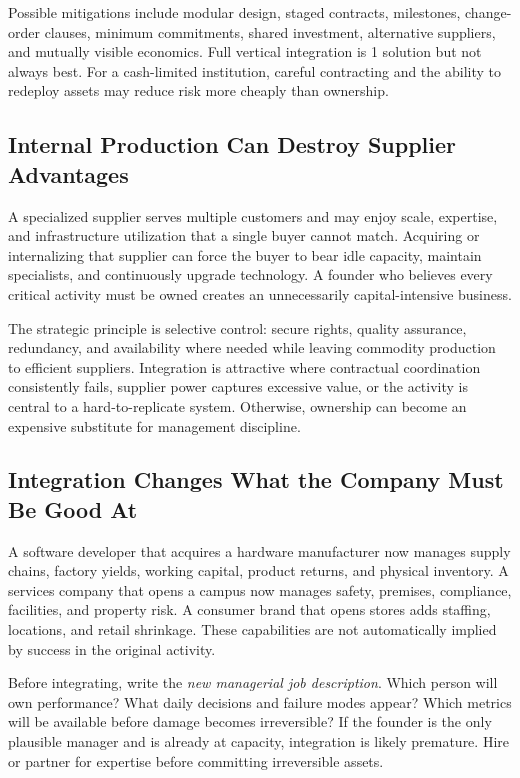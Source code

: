 Possible mitigations include modular design, staged contracts, milestones, change-order clauses, minimum commitments, shared investment, alternative suppliers, and mutually visible economics. Full vertical integration is 1 solution but not always best. For a cash-limited institution, careful contracting and the ability to redeploy assets may reduce risk more cheaply than ownership.

\subsection{Internal Production Can Destroy Supplier Advantages}
\label{sec:internal_production_destroy_supplier_scale}

A specialized supplier serves multiple customers and may enjoy scale, expertise, and infrastructure utilization that a single buyer cannot match. Acquiring or internalizing that supplier can force the buyer to bear idle capacity, maintain specialists, and continuously upgrade technology. A founder who believes every critical activity must be owned creates an unnecessarily capital-intensive business.

The strategic principle is selective control: secure rights, quality assurance, redundancy, and availability where needed while leaving commodity production to efficient suppliers. Integration is attractive where contractual coordination consistently fails, supplier power captures excessive value, or the activity is central to a hard-to-replicate system. Otherwise, ownership can become an expensive substitute for management discipline.

\subsection{Integration Changes What the Company Must Be Good At}
\label{sec:integration_changes_required_competencies}

A software developer that acquires a hardware manufacturer now manages supply chains, factory yields, working capital, product returns, and physical inventory. A services company that opens a campus now manages safety, premises, compliance, facilities, and property risk. A consumer brand that opens stores adds staffing, locations, and retail shrinkage. These capabilities are not automatically implied by success in the original activity.

Before integrating, write the \textit{new managerial job description}. Which person will own performance? What daily decisions and failure modes appear? Which metrics will be available before damage becomes irreversible? If the founder is the only plausible manager and is already at capacity, integration is likely premature. Hire or partner for expertise before committing irreversible assets.

